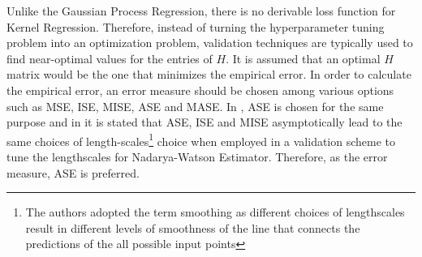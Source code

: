 Unlike the Gaussian Process Regression, there is no derivable loss function for Kernel Regression. Therefore, instead of turning the hyperparameter tuning problem into an optimization problem, validation techniques are typically used to find near-optimal values for the entries of $H$. It is assumed that an optimal $H$ matrix would be the one that minimizes the empirical error. In order to calculate the empirical error, an error measure should be chosen among various options such as MSE, ISE, MISE, ASE and MASE. In \cite[p. 110]{hardle_nonparametric_2012}, ASE is chosen for the same purpose and in \cite{hardle_optimal_1985} it is stated that ASE, ISE and MISE asymptotically lead to the same choices of length-scales\footnote{The authors adopted the term smoothing as different choices of lengthscales result in different levels of smoothness of the line that connects the predictions of the all possible input points} choice when employed in a validation scheme to tune the lengthscales for Nadarya-Watson Estimator. Therefore, as the error measure, ASE is preferred.

